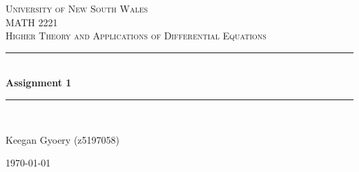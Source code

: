 \documentclass[a4paper]{article}
\begin{document}
\newlength{\strutheight}
\settoheight{\strutheight}{\strut}

\begin{titlepage}

\newcommand{\HRule}{\rule{\linewidth}{0.5mm}} %

\center %
 
\textsc{\LARGE University of New South Wales}\\[1.5cm] %
\textsc{\Large MATH 2221}\\[0.5cm] %
\textsc{\large Higher Theory and Applications of Differential Equations}\\[0.5cm] %

\HRule \\[0.4cm]
{ \huge \bfseries Assignment 1}\\[0.4cm] %
\HRule \\[1.5cm]


\begin{center} \large
Keegan Gyoery (z5197058) %
\\
\end{center}


\vspace{4cm}

{\today}\\[3cm] %

\vfill %

\end{titlepage}

\end{document}
